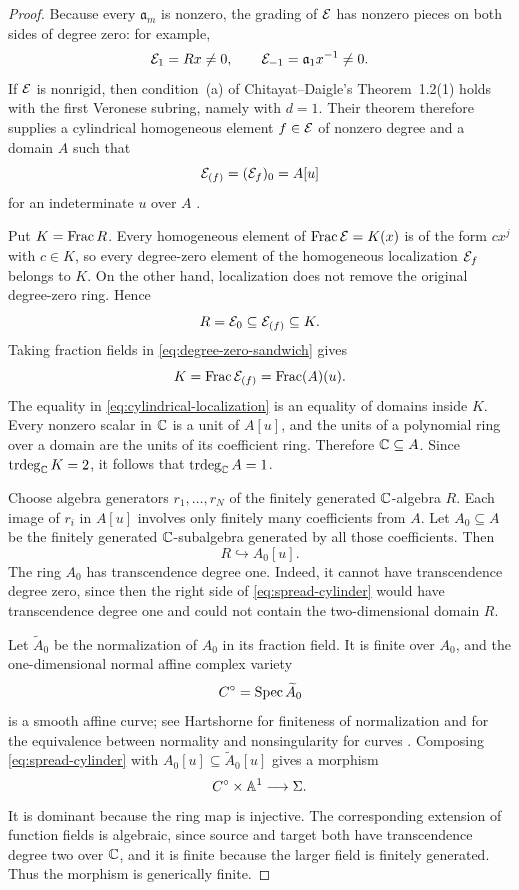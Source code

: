 \begin{proof}
Because every $\mathfrak a_m$ is nonzero, the grading of $\mathcal E$ has nonzero pieces on both sides of degree zero: for example,
\[
  \mathcal E_1=Rx\neq0,
  \qquad
  \mathcal E_{-1}=\mathfrak a_1x^{-1}\neq0.
\]
If $\mathcal E$ is nonrigid, then condition~(a) of Chitayat--Daigle's Theorem~1.2(1) holds with the first Veronese subring, namely with $d=1$.  Their theorem therefore supplies a cylindrical homogeneous element $f\in\mathcal E$ of nonzero degree and a domain $A$ such that
\begin{equation}\label{eq:cylindrical-localization}
  \mathcal E_{(f)}=(\mathcal E_f)_0=A[u]
\end{equation}
for an indeterminate $u$ over $A$ \cite[Theorem~1.2(1)]{ChitayatDaigle2024}.

Put $K=\operatorname{Frac} R$.  Every homogeneous element of $\operatorname{Frac}\mathcal E=K(x)$ is of the form $c x^j$ with $c\in K$, so every degree-zero element of the homogeneous localization $\mathcal E_f$ belongs to $K$.  On the other hand, localization does not remove the original degree-zero ring.  Hence
\begin{equation}\label{eq:degree-zero-sandwich}
  R=\mathcal E_0\subseteq\mathcal E_{(f)}\subseteq K.
\end{equation}
Taking fraction fields in \eqref{eq:degree-zero-sandwich} gives
\[
  K=\operatorname{Frac}\mathcal E_{(f)}=\operatorname{Frac}(A)(u).
\]
The equality in \eqref{eq:cylindrical-localization} is an equality of domains inside $K$.  Every nonzero scalar in $\mathbb C$ is a unit of $A[u]$, and the units of a polynomial ring over a domain are the units of its coefficient ring.  Therefore $\mathbb C\subseteq A$.  Since $\operatorname{trdeg}_{\mathbb C}K=2$, it follows that $\operatorname{trdeg}_{\mathbb C}A=1$.

Choose algebra generators $r_1,\ldots,r_N$ of the finitely generated $\mathbb C$-algebra $R$.  Each image of $r_i$ in $A[u]$ involves only finitely many coefficients from $A$.  Let $A_0\subseteq A$ be the finitely generated $\mathbb C$-subalgebra generated by all those coefficients.  Then
\begin{equation}\label{eq:spread-cylinder}
  R\hookrightarrow A_0[u].
\end{equation}
The ring $A_0$ has transcendence degree one.  Indeed, it cannot have transcendence degree zero, since then the right side of \eqref{eq:spread-cylinder} would have transcendence degree one and could not contain the two-dimensional domain $R$.

Let $\widetilde A_0$ be the normalization of $A_0$ in its fraction field.  It is finite over $A_0$, and the one-dimensional normal affine complex variety
\[
  C^{\circ}=\operatorname{Spec}\widetilde A_0
\]
is a smooth affine curve; see Hartshorne for finiteness of normalization and for the equivalence between normality and nonsingularity for curves \cite[Chapter I, Sections 3 and 6]{Hartshorne1977}.  Composing \eqref{eq:spread-cylinder} with $A_0[u]\subseteq\widetilde A_0[u]$ gives a morphism
\[
  C^{\circ}\times\mathbb A^1\longrightarrow\Sigma.
\]
It is dominant because the ring map is injective.  The corresponding extension of function fields is algebraic, since source and target both have transcendence degree two over $\mathbb C$, and it is finite because the larger field is finitely generated.  Thus the morphism is generically finite.


\end{proof}
